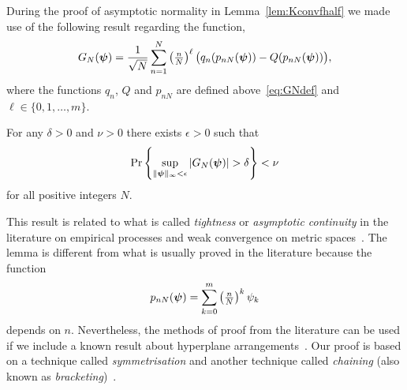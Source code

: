 \documentclass[journal]{IEEEtran}
\begin{document}
During the proof of asymptotic normality in Lemma~\ref{lem:Kconvfhalf} we made use of the following result regarding the function,
\[
G_N(\boldsymbol{\psi}) = \frac{1}{\sqrt{N}} \sum_{n=1}^{N}\left( \tfrac{n}{N}\right)^\ell  \big(q_n(p_{nN}(\boldsymbol{\psi})) - Q(p_{nN}(\boldsymbol{\psi})) \big),
\]
where the functions $q_n$, $Q$ and $p_{nN}$ are defined above~\eqref{eq:GNdef} and $\ell \in \{0, 1, \dots, m\}$.

\begin{lemma}\label{lem:unifprobG}
For any $\delta >0$ and $\nu > 0$ there exists $\epsilon > 0$ such that
\[
\prob\left\{ \sup_{\|\psibf\|_{\infty} < \epsilon} \abs{ G_N(\psibf) } > \delta   \right\} < \nu %
\]
for all positive integers $N$.
\end{lemma}

This result is related to what is called \emph{tightness} or \emph{asymptotic continuity} in the literature on empirical processes and weak convergence on metric spaces~\cite{Billingsley1999_convergence_of_probability_measures,Dudley_unif_central_lim_th_1999,Shorak_emp_proc_stat_2009,van2009empirical}.  The lemma is different from what is usually proved in the literature because the function 
\[
p_{nN}(\boldsymbol{\psi}) = \sum_{k=0}^m\left( \tfrac{n}{N}\right)^k\psi_k
\]
depends on $n$.  Nevertheless, the methods of proof from the literature can be used if we include a known result about hyperplane arrangements~\cite[Ch. 5]{Chazelle_discrepency_method_2000}\cite[Ch. 6]{Matousek_lect_disc_geom_2002}. Our proof is based on a technique called \emph{symmetrisation} and another technique called \emph{chaining} (also known as \emph{bracketing})~\cite{Pollard_asymp_empi_proc_1989,van2009empirical}.
\end{document}
